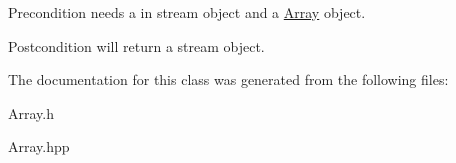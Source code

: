 \begin{DoxyPrecond}{Precondition}
needs a in stream object and a \hyperlink{classArray}{Array} object. 
\end{DoxyPrecond}
\begin{DoxyPostcond}{Postcondition}
will return a stream object. 
\end{DoxyPostcond}


The documentation for this class was generated from the following files\+:\begin{DoxyCompactItemize}
\item 
Array.\+h\item 
Array.\+hpp\end{DoxyCompactItemize}
